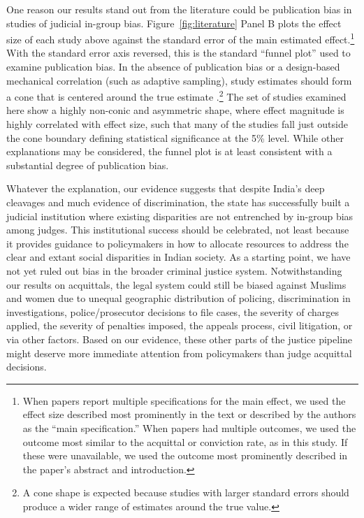 \documentclass[12pt,english]{article}
\begin{document}
One reason our results stand out from the literature could be publication bias in studies of judicial in-group bias. Figure~\ref{fig:literature} Panel B plots the effect size of each study above against the standard error of the main estimated effect.\footnote{When papers report multiple specifications for the main effect, we used the effect size described most prominently in the text or described by the authors as the ``main specification.'' When papers had multiple outcomes, we used the outcome most similar to the acquittal or conviction rate, as in this study. If these were unavailable, we used the outcome most prominently described in the paper's abstract and introduction.} With the standard error axis reversed, this is the standard ``funnel plot'' used to examine publication bias. In the absence of publication bias or a design-based mechanical correlation (such as adaptive sampling), study estimates should form a cone that is centered around the true estimate \citep{egger1997bias,gerber2001testing,levine2009sample,slavin2009relationship,kuhberger2014publication}.\footnote{A cone shape is expected because studies with larger standard errors should produce a wider range of estimates around the true value.} The set of studies examined here show a highly non-conic and asymmetric shape, where effect magnitude is highly correlated with effect size, such that many of the studies fall just outside the cone boundary defining statistical significance at the 5\% level. While other explanations may be considered, the funnel plot is at least consistent with a substantial degree of publication bias.

Whatever the explanation, our evidence suggests that despite India's deep cleavages and much evidence of discrimination, the state has successfully built a judicial institution where existing disparities are not entrenched by in-group bias among judges. This institutional success should be celebrated, not least because it provides guidance to policymakers in how to allocate resources to address the clear and extant social disparities in Indian society. As a starting point, we have not yet ruled out bias in the broader criminal justice system. %
Notwithstanding our results on acquittals, the legal system could still be biased against Muslims and women due to unequal geographic distribution of policing, discrimination in investigations, police/prosecutor decisions to file cases, the severity of charges applied, the severity of penalties imposed, the appeals process, civil litigation, or via other factors. Based on our evidence, these other parts of the justice pipeline might deserve more immediate attention from policymakers than judge acquittal decisions. 
\end{document}
